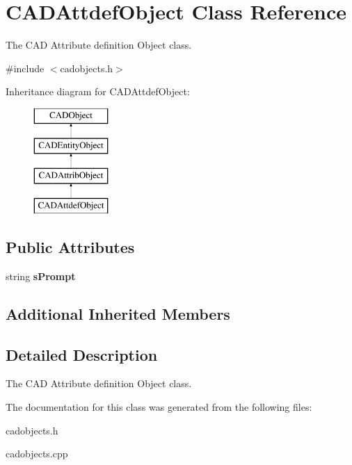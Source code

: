 \hypertarget{class_c_a_d_attdef_object}{}\section{C\+A\+D\+Attdef\+Object Class Reference}
\label{class_c_a_d_attdef_object}


The C\+AD Attribute definition Object class.  




{\ttfamily \#include $<$cadobjects.\+h$>$}

Inheritance diagram for C\+A\+D\+Attdef\+Object\+:\begin{figure}[H]
\begin{center}
\leavevmode
\includegraphics[height=4.000000cm]{class_c_a_d_attdef_object}
\end{center}
\end{figure}
\subsection*{Public Attributes}
\begin{DoxyCompactItemize}
\item 
string {\bfseries s\+Prompt}\hypertarget{class_c_a_d_attdef_object_a740ca29cffee8eda821d174b3174f6c1}{}\label{class_c_a_d_attdef_object_a740ca29cffee8eda821d174b3174f6c1}

\end{DoxyCompactItemize}
\subsection*{Additional Inherited Members}


\subsection{Detailed Description}
The C\+AD Attribute definition Object class. 

The documentation for this class was generated from the following files\+:\begin{DoxyCompactItemize}
\item 
cadobjects.\+h\item 
cadobjects.\+cpp\end{DoxyCompactItemize}
